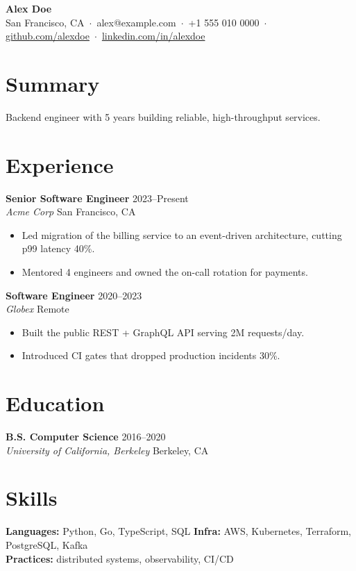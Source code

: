 \documentclass[11pt,a4paper]{article}
\newcommand{\entry}[4]{\textbf{#1} \hfill #2\\ \textit{#3} \hfill #4}
\begin{document}
\begin{center}
  {\LARGE\bfseries Alex Doe}\\[3pt]
  San Francisco, CA \,$\cdot$\, alex@example.com \,$\cdot$\, +1 555 010 0000 \,$\cdot$\,
  \href{https://github.com/alexdoe}{github.com/alexdoe} \,$\cdot$\,
  \href{https://linkedin.com/in/alexdoe}{linkedin.com/in/alexdoe}
\end{center}

\section{Summary}
Backend engineer with 5 years building reliable, high-throughput services.

\section{Experience}
\entry{Senior Software Engineer}{2023--Present}{Acme Corp}{San Francisco, CA}
\begin{itemize}
  \item Led migration of the billing service to an event-driven architecture, cutting p99 latency 40\%.
  \item Mentored 4 engineers and owned the on-call rotation for payments.
\end{itemize}
\vspace{4pt}
\entry{Software Engineer}{2020--2023}{Globex}{Remote}
\begin{itemize}
  \item Built the public REST + GraphQL API serving 2M requests/day.
  \item Introduced CI gates that dropped production incidents 30\%.
\end{itemize}

\section{Education}
\entry{B.S. Computer Science}{2016--2020}{University of California, Berkeley}{Berkeley, CA}

\section{Skills}
\textbf{Languages:} Python, Go, TypeScript, SQL \quad
\textbf{Infra:} AWS, Kubernetes, Terraform, PostgreSQL, Kafka \\
\textbf{Practices:} distributed systems, observability, CI/CD
\end{document}
